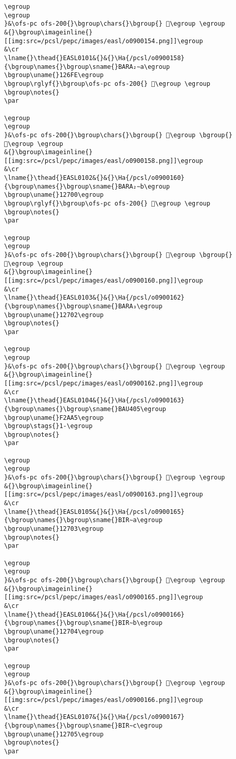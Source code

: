 \begin{verbatim}
\egroup
\egroup
}&\ofs-pc ofs-200{}\bgroup\chars{}\bgroup{} 𒛽\egroup \egroup
&{}\bgroup\imageinline{}[[img:src=/pcsl/pepc/images/easl/o0900154.png]]\egroup
&\cr
\lname{}\thead{}EASL0101&{}&{}\Ha{/pcsl/o0900158}{\bgroup\names{}\bgroup\sname{}BARA₂∼a\egroup
\bgroup\uname{}126FE\egroup
\bgroup\rglyf{}\bgroup\ofs-pc ofs-200{} 𒛾\egroup \egroup
\bgroup\notes{}
\par 

\egroup
\egroup
}&\ofs-pc ofs-200{}\bgroup\chars{}\bgroup{} 𒛾\egroup \bgroup{} 𒛿\egroup \egroup
&{}\bgroup\imageinline{}[[img:src=/pcsl/pepc/images/easl/o0900158.png]]\egroup
&\cr
\lname{}\thead{}EASL0102&{}&{}\Ha{/pcsl/o0900160}{\bgroup\names{}\bgroup\sname{}BARA₂∼b\egroup
\bgroup\uname{}12700\egroup
\bgroup\rglyf{}\bgroup\ofs-pc ofs-200{} 𒜀\egroup \egroup
\bgroup\notes{}
\par 

\egroup
\egroup
}&\ofs-pc ofs-200{}\bgroup\chars{}\bgroup{} 𒜀\egroup \bgroup{} 𒜁\egroup \egroup
&{}\bgroup\imageinline{}[[img:src=/pcsl/pepc/images/easl/o0900160.png]]\egroup
&\cr
\lname{}\thead{}EASL0103&{}&{}\Ha{/pcsl/o0900162}{\bgroup\names{}\bgroup\sname{}BARA₃\egroup
\bgroup\uname{}12702\egroup
\bgroup\notes{}
\par 

\egroup
\egroup
}&\ofs-pc ofs-200{}\bgroup\chars{}\bgroup{} 𒜂\egroup \egroup
&{}\bgroup\imageinline{}[[img:src=/pcsl/pepc/images/easl/o0900162.png]]\egroup
&\cr
\lname{}\thead{}EASL0104&{}&{}\Ha{/pcsl/o0900163}{\bgroup\names{}\bgroup\sname{}BAU405\egroup
\bgroup\uname{}F2AA5\egroup
\bgroup\stags{}1-\egroup
\bgroup\notes{}
\par 

\egroup
\egroup
}&\ofs-pc ofs-200{}\bgroup\chars{}\bgroup{} 󲪥\egroup \egroup
&{}\bgroup\imageinline{}[[img:src=/pcsl/pepc/images/easl/o0900163.png]]\egroup
&\cr
\lname{}\thead{}EASL0105&{}&{}\Ha{/pcsl/o0900165}{\bgroup\names{}\bgroup\sname{}BIR∼a\egroup
\bgroup\uname{}12703\egroup
\bgroup\notes{}
\par 

\egroup
\egroup
}&\ofs-pc ofs-200{}\bgroup\chars{}\bgroup{} 𒜃\egroup \egroup
&{}\bgroup\imageinline{}[[img:src=/pcsl/pepc/images/easl/o0900165.png]]\egroup
&\cr
\lname{}\thead{}EASL0106&{}&{}\Ha{/pcsl/o0900166}{\bgroup\names{}\bgroup\sname{}BIR∼b\egroup
\bgroup\uname{}12704\egroup
\bgroup\notes{}
\par 

\egroup
\egroup
}&\ofs-pc ofs-200{}\bgroup\chars{}\bgroup{} 𒜄\egroup \egroup
&{}\bgroup\imageinline{}[[img:src=/pcsl/pepc/images/easl/o0900166.png]]\egroup
&\cr
\lname{}\thead{}EASL0107&{}&{}\Ha{/pcsl/o0900167}{\bgroup\names{}\bgroup\sname{}BIR∼c\egroup
\bgroup\uname{}12705\egroup
\bgroup\notes{}
\par 


\end{verbatim}
